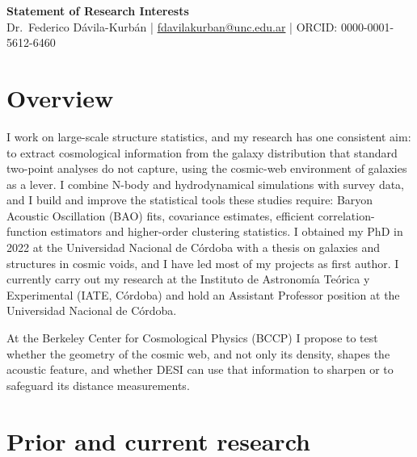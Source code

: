 \documentclass[11pt,a4paper]{article}
\begin{document}
\begin{center}
{\Large\bfseries Statement of Research Interests}\\[4pt]
Dr.\ Federico D\'avila-Kurb\'an \;|\; \href{mailto:fdavilakurban@unc.edu.ar}{fdavilakurban@unc.edu.ar} \;|\; ORCID: 0000-0001-5612-6460
\end{center}

\section*{Overview}

I work on large-scale structure statistics, and my research has one consistent aim: to extract cosmological information from the galaxy distribution that standard two-point analyses do not capture, using the cosmic-web environment of galaxies as a lever. I combine N-body and hydrodynamical simulations with survey data, and I build and improve the statistical tools these studies require: Baryon Acoustic Oscillation (BAO) fits, covariance estimates, efficient correlation-function estimators and higher-order clustering statistics. I obtained my PhD in 2022 at the Universidad Nacional de C\'ordoba with a thesis on galaxies and structures in cosmic voids, and I have led most of my projects as first author. I currently carry out my research at the Instituto de Astronom\'ia Te\'orica y Experimental (IATE, C\'ordoba) and hold an Assistant Professor position at the Universidad Nacional de C\'ordoba.

At the Berkeley Center for Cosmological Physics (BCCP) I propose to test whether the geometry of the cosmic web, and not only its density, shapes the acoustic feature, and whether DESI can use that information to sharpen or to safeguard its distance measurements.

\section*{Prior and current research}
\end{document}
